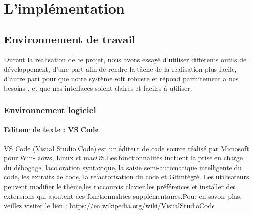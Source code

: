 \chapter{L’implémentation}

\section{Environnement de travail}
Durant la réalisation de ce projet, nous avons essayé d’utiliser différents
outils de développement, d’une part afin de rendre la tâche de la
réalisation plus facile, d’autre part pour que notre système soit robuste et
répond parfaitement a nos besoins , et que nos interfaces soient claires et
faciles à utiliser.
\subsection{Environnement logiciel}

\subsubsection{Editeur de texte : VS Code}
VS Code (Visual Studio Code) est un éditeur de code source réalisé par Microsoft pour Win-
dows, Linux et macOS.Les fonctionnalités incluent la prise en charge du débogage, lacoloration
syntaxique, la saisie semi-automatique intelligente du code, les extraits de code, la refactorisation du
code et Gitintégré. Les utilisateurs peuvent modifier le thème,les raccourcis clavier,les préférences et
installer des extensions qui ajoutent des fonctionnalités supplémentaires.\newline Pour en savoir plus, veillez
visiter le lien : \href{https://en.wikipedia.org/wiki/VisualStudioCode}{https://en.wikipedia.org/wiki/VisualStudioCode}
